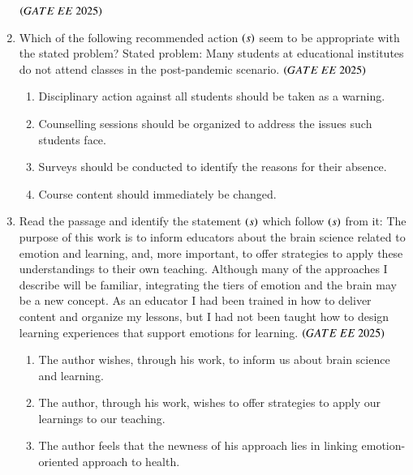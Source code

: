 \documentclass[journal,12pt,onecolumn]{IEEEtran}
\theoremstyle{remark}
\begin{document}
\begin{enumerate}
\hfill $\brak{GATE\ EE\ 2025}$
    \begin{enumerate}
      \end{enumerate}
  \item Which of the following recommended action $\left(s\right)$ seem to be appropriate with the stated problem?  
      Stated problem: Many students at educational institutes do not attend classes in the post-pandemic scenario.  
     \hfill $\brak{GATE\ EE\ 2025}$
    \begin{enumerate}
  \item Disciplinary action against all students should be taken as a warning.   
  \item Counselling sessions should be organized to address the issues such students face.
  \item Surveys should be conducted to identify the reasons for their absence.
  \item Course content should immediately be changed.
   \end{enumerate}
   \item Read the passage and identify the statement $\left(s\right)$ which follow $\left(s\right)$ from it: 
      The purpose of this work is to inform educators about the brain science related to emotion and learning, and, more important, to offer strategies to apply these understandings to their own teaching. Although many of the approaches I describe will be familiar, integrating the tiers of emotion and the brain may be a new concept. As an educator I had been trained in how to deliver content and organize my lessons, but I had not been taught how to design learning experiences that support emotions for learning.       
     \hfill $\brak{GATE\ EE\ 2025}$
    \begin{enumerate}
    \item  The author wishes, through his work, to inform us about brain science and learning.    
  \item The author, through his work, wishes to offer strategies to apply our learnings to our teaching.    
  \item The author feels that the newness of his approach lies in linking emotion-oriented approach to health.   

\end{enumerate}
\end{enumerate}
\end{document}
